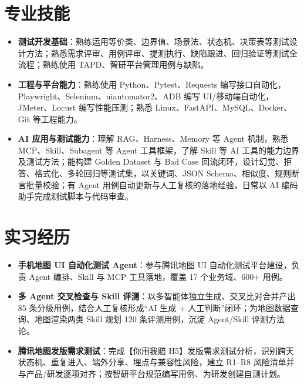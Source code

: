 \documentclass[10pt]{article}
\begin{document}
    \ResumeContactBar
    \ResumeProfileAndEducation


    \section[专业技能]{\makebox[\iconwidth][c]{\color{primarycolor}{\faWrench}}\quad 专业技能}
    \begin{itemize}
        \item \textbf{测试开发基础}：熟练运用等价类、边界值、场景法、状态机、决策表等测试设计方法；熟悉需求评审、用例评审、提测执行、缺陷跟进、回归验证等测试全流程；熟练使用 TAPD、智研平台管理用例与缺陷。
        \item \textbf{工程与平台能力}：熟练使用 Python、Pytest、Requests 编写接口自动化，Playwright、Selenium、uiautomator2、ADB 编写 UI/移动端自动化，JMeter、Locust 编写性能压测；熟悉 Linux、FastAPI、MySQL、Docker、Git 等工程能力。
        \item \textbf{AI 应用与测试能力}：理解 RAG、Harness、Memory 等 Agent 机制，熟悉 MCP、Skill、Subagent 等 Agent 工具框架，了解 Skill 等 AI 工具的能力边界及测试方法；能构建 Golden Dataset 与 Bad Case 回流闭环，设计幻觉、拒答、格式化、多轮回归等测试集，以关键词、JSON Schema、相似度、规则断言批量校验；有 Agent 用例自动更新与人工复核的落地经验，日常以 AI 编码助手完成测试脚本与代码审查。
    \end{itemize}



    \section[实习经历]{\makebox[\iconwidth][c]{\color{primarycolor}{\faBriefcase}}\quad 实习经历}

    \begin{itemize}
        \item \textbf{手机地图 UI 自动化测试 Agent}：参与腾讯地图 UI 自动化测试平台建设，负责 Agent 编排、Skill 与 MCP 工具落地，覆盖 17 个业务域、600+ 用例。
        \item \textbf{多 Agent 交叉检查与 Skill 评测}：以多智能体独立生成、交叉比对合并产出 85 条分级用例，结合人工复核形成“AI 生成 + 人工判断”闭环；为地图数据查询、地图渲染两类 Skill 规划 120 条评测用例，沉淀 Agent/Skill 评测方法论。
        \item \textbf{腾讯地图发版需求测试}：完成【你用我赔 H5】发版需求测试分析，识别跨天状态机、重复进入、端外分享、埋点与兼容性风险，建立 R1--R8 风险清单并与产品/研发逐项对齐；按智研平台规范编写用例、为研发创建自测计划。
    \end{itemize}
\end{document}
